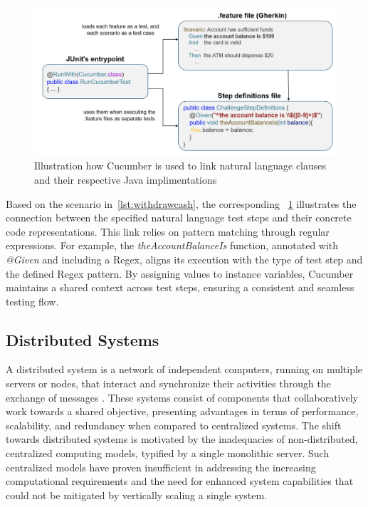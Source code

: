 \begin{figure}
    \centering
    \includegraphics[width=\linewidth]{files/figures/cucumber_test_step_mapping.png}
    \caption{Illustration how Cucumber is used to link natural language clauses and their respective Java implimentations}
    \label{fig:cucumber-mapping}
\end{figure}

Based on the scenario in~\cref{lst:withdrawcash}, the corresponding ~\cref{fig:cucumber-mapping} illustrates the connection between the specified natural language test steps and their concrete code representations. This link relies on pattern matching through regular expressions. For example, the \textit{theAccountBalanceIs} function, annotated with \textit{@Given} and including a \ac{Regex}, aligns its execution with the type of test step and the defined \ac{Regex} pattern. By assigning values to instance variables, Cucumber maintains a shared context across test steps, ensuring a consistent and seamless testing flow.~\cite{noauthor_bdd_nodate}

\subsection{Distributed Systems}
\label{subsec:dissys}
A distributed system is a network of independent computers, running on multiple servers or nodes, that interact and synchronize their activities through the exchange of messages \cite{tanenbaum2007distributed}. These systems consist of components that collaboratively work towards a shared objective, presenting advantages in terms of performance, scalability, and redundancy when compared to centralized systems. The shift towards distributed systems is motivated by the inadequacies of non-distributed, centralized computing models, typified by a single monolithic server. Such centralized models have proven insufficient in addressing the increasing computational requirements and the need for enhanced system capabilities that could not be mitigated by vertically scaling a single system.

